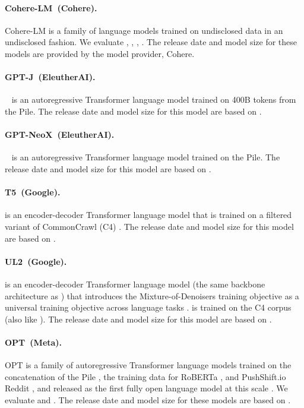 \paragraph{Cohere-LM~(Cohere).}
Cohere-LM is a family of language models trained on undisclosed data in an undisclosed fashion.
We evaluate \coheres, \coherem, \coherel, \coherexl. 
The release date and model size for these models are provided by the model provider, Cohere.

\paragraph{GPT-J~(EleutherAI).} 
\gptj~\citep{wang2021gptj} is an autoregressive Transformer language model trained on 400B tokens from the Pile.
The release date and model size for this model are based on \citet{wang2021gptj}.

\paragraph{GPT-NeoX~(EleutherAI).}
\gptneox~\citep{black2022neox} is an autoregressive Transformer language model trained on the Pile.
The release date and model size for this model are based on \citet{black2022neox}.

\paragraph{T5~(Google).}
\tfive is an encoder-decoder Transformer language model that is trained on a filtered variant of CommonCrawl (C4) \citep{raffel2019exploring}. 
The release date and model size for this model are based on \citet{raffel2019exploring}.

\paragraph{UL2~(Google).}
\ultwo is an encoder-decoder Transformer language model (\ie the same backbone architecture as \tfive) that introduces the Mixture-of-Denoisers training objective as a universal training objective across language tasks \citep{tay2022unifying}. \ultwo is trained on the C4 corpus (also like \tfive). 
The release date and model size for this model are based on \citet{tay2022unifying}.

\paragraph{OPT~(Meta).}
OPT is a family of autoregressive Transformer language models trained on the concatenation of the Pile \citep{gao2021thepile}, the training data for RoBERTa \citep{liu2019roberta}, and PushShift.io Reddit \citep{baumgartner2020pushshift,  roller2021recipes}, and released as the first fully open language model at this scale \citep{zhang2022opt}. 
We evaluate \optsixsix and \optonesevenfive. 
The release date and model size for these models are based on \citet{zhang2022opt}.

